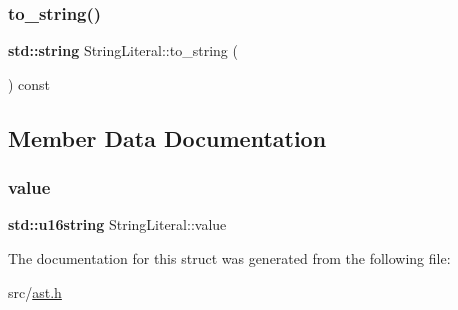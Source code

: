 \subsubsection{\texorpdfstring{to\+\_\+string()}{to\_string()}}
{\footnotesize\ttfamily \textbf{ std\+::string} String\+Literal\+::to\+\_\+string (\begin{DoxyParamCaption}{ }\end{DoxyParamCaption}) const\hspace{0.3cm}{\ttfamily [inline]}}



\subsection{Member Data Documentation}
\mbox{\label{struct_string_literal_a6e41d06a20217417a1bf70171235a711}} 
\subsubsection{\texorpdfstring{value}{value}}
{\footnotesize\ttfamily \textbf{ std\+::u16string} String\+Literal\+::value}



The documentation for this struct was generated from the following file\+:\begin{DoxyCompactItemize}
\item 
src/\hyperlink{ast_8h}{ast.\+h}\end{DoxyCompactItemize}
